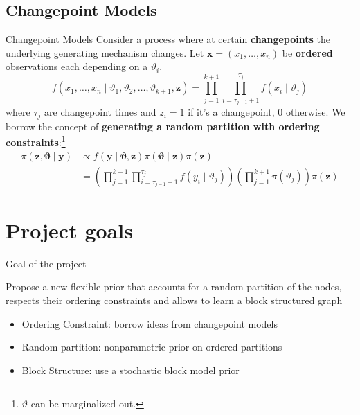 \subsection{Changepoint Models}
\begin{frame}{Changepoint Models}
    Consider a process where at certain \textbf{changepoints} the underlying generating mechanism changes. Let $\bm{x}=(x_{1},\ldots,x_{n})$ be \textbf{ordered} observations each depending on a $\vartheta_{i}.$\\
    \[
        f(x_{1},\ldots,x_{n} \mid \vartheta_1, \vartheta_2, \ldots, \vartheta_{k+1}, \bm{z})=\prod_{j=1}^{k+1} \prod_{i=\tau_{j-1}+1}^{\tau_j} f(x_i \mid \vartheta_j)
    \]
    where $\tau_j$ are changepoint times and $z_{i} = 1$ if it's a changepoint, $0$ otherwise.
    We borrow the concept of \textbf{generating a random partition with ordering constraints}:\footnote{$\vartheta$ can be marginalized out.}
    \begin{align*}
        \pi(\bm{z}, \bm{\vartheta} \mid \bm{y}) & \propto f(\bm{y} \mid \bm{\vartheta}, \bm{z}) \pi(\bm{\vartheta} \mid \bm{z}) \pi(\bm{z}) \\
        &=\left(\prod_{j=1}^{k+1} \prod_{i=\tau_{j-1}+1}^{\tau_j} f(y_i \mid \vartheta_j)\right)\left(\prod_{j=1}^{k+1} \pi(\vartheta_j)\right) \pi(\bm{z})
    \end{align*}
\end{frame}








\section{Project goals}


\begin{frame}[containsverbatim]{Goal of the project}

Propose a \alert {new flexible prior that accounts for a random partition of the nodes}, respects their ordering constraints and allows to learn a block structured graph

 \begin{itemize}
     \item Ordering Constraint: borrow ideas from changepoint models
     \item Random partition: nonparametric prior on ordered partitions
     \item Block Structure: use a stochastic block model prior
 \end{itemize}



\end{frame}

